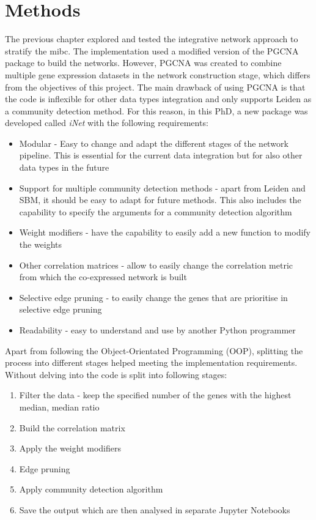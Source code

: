 \section{Methods} \label{s:N_II:methods}

The previous chapter explored and tested the integrative network approach to stratify the \acrlong{mibc}. The implementation used a modified version of the PGCNA package to build the networks. However, PGCNA was created to combine multiple gene expression datasets in the network construction stage, which differs from the objectives of this project. The main drawback of using PGCNA is that the code is inflexible for other data types integration and only supports Leiden as a community detection method. For this reason, in this PhD, a new package was developed called \textit{iNet} with the following requirements: 

\begin{itemize}
    \item Modular - Easy to change and adapt the different stages of the network pipeline. This  is essential for the current data integration but for also other data types in the future
    \item Support for multiple community detection methods - apart from Leiden and SBM, it should be easy to adapt for future methods. This also includes the capability to specify the arguments for a community detection algorithm
    \item Weight modifiers - have the capability to easily add a new function to modify the weights
    \item Other correlation matrices - allow to easily change the correlation metric from which the co-expressed network is built
    \item Selective edge pruning - to easily change the genes that are prioritise in selective edge pruning 
    \item Readability - easy to understand and use by another Python programmer
\end{itemize}

Apart from following the Object-Orientated Programming (OOP), splitting the process into different stages helped meeting the implementation requirements. Without delving into the code is split into following stages:
\begin{enumerate}
    \item Filter the data - keep the specified number of the genes with the highest median, median ratio
    \item Build the correlation matrix
    \item Apply the weight modifiers
    \item Edge pruning
    \item Apply community detection algorithm
    \item Save the output which are then analysed in separate Jupyter Notebooks
\end{enumerate}

